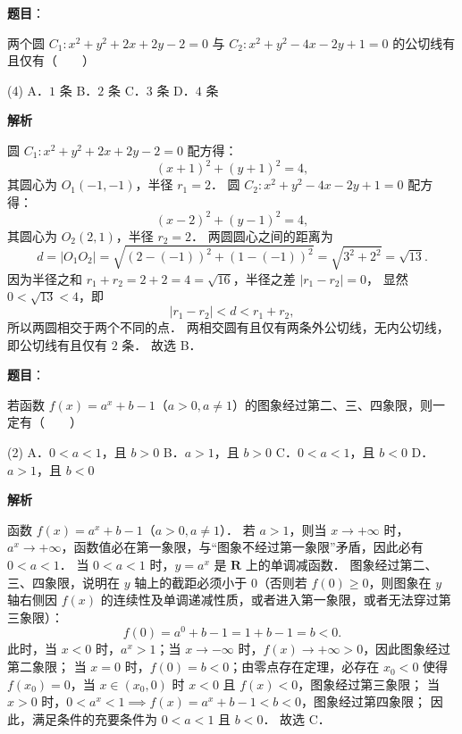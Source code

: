 \begin{answer}

\textbf{题目}：

两个圆 $C_1: x^2 + y^2 + 2x + 2y - 2 = 0$ 与 $C_2: x^2 + y^2 - 4x - 2y + 1 = 0$ 的公切线有且仅有\mbox{（　　）}

\begin{gkopts}(4)
\task A．$1$ 条
\task B．$2$ 条
\task C．$3$ 条
\task D．$4$ 条
\end{gkopts}

\textbf{解析}

圆 $C_1: x^2 + y^2 + 2x + 2y - 2 = 0$ 配方得：
\nopagebreak[4]
\[
(x + 1)^2 + (y + 1)^2 = 4,
\]
其圆心为 $O_1(-1, -1)$，半径 $r_1 = 2$．
圆 $C_2: x^2 + y^2 - 4x - 2y + 1 = 0$ 配方得：
\nopagebreak[4]
\[
(x - 2)^2 + (y - 1)^2 = 4,
\]
其圆心为 $O_2(2, 1)$，半径 $r_2 = 2$．
两圆圆心之间的距离为
\nopagebreak[4]
\[
d = |O_1O_2| = \sqrt{(2 - (-1))^2 + (1 - (-1))^2} = \sqrt{3^2 + 2^2} = \sqrt{13}.
\]
因为半径之和 $r_1 + r_2 = 2 + 2 = 4 = \sqrt{16}$，半径之差 $|r_1 - r_2| = 0$，
显然 $0 < \sqrt{13} < 4$，即
\nopagebreak[4]
\[
|r_1 - r_2| < d < r_1 + r_2,
\]
所以两圆相交于两个不同的点．
两相交圆有且仅有两条外公切线，无内公切线，即公切线有且仅有 $2$ 条．
故选 B．


\end{answer}
\begin{answer}

\textbf{题目}：

若函数 $f(x) = a^x + b - 1$（$a > 0, a \neq 1$）的图象经过第二、三、四象限，则一定有\mbox{（　　）}

\begin{gkopts}(2)
\task A．$0 < a < 1$，且 $b > 0$
\task B．$a > 1$，且 $b > 0$
\task C．$0 < a < 1$，且 $b < 0$
\task D．$a > 1$，且 $b < 0$
\end{gkopts}

\textbf{解析}

函数 $f(x) = a^x + b - 1$（$a > 0, a \neq 1$）．
若 $a > 1$，则当 $x \to +\infty$ 时，$a^x \to +\infty$，函数值必在第一象限，与“图象不经过第一象限”矛盾，因此必有 $0 < a < 1$．
当 $0 < a < 1$ 时，$y = a^x$ 是 $\mathbf{R}$ 上的单调减函数．
图象经过第二、三、四象限，说明在 $y$ 轴上的截距必须小于 $0$（否则若 $f(0) \geqslant 0$，则图象在 $y$ 轴右侧因 $f(x)$ 的连续性及单调递减性质，或者进入第一象限，或者无法穿过第三象限）：
\nopagebreak[4]
\[
f(0) = a^0 + b - 1 = 1 + b - 1 = b < 0.
\]
此时，当 $x < 0$ 时，$a^x > 1$；当 $x \to -\infty$ 时，$f(x) \to +\infty > 0$，因此图象经过第二象限；
当 $x = 0$ 时，$f(0) = b < 0$；由零点存在定理，必存在 $x_0 < 0$ 使得 $f(x_0) = 0$，当 $x \in (x_0, 0)$ 时 $x < 0$ 且 $f(x) < 0$，图象经过第三象限；
当 $x > 0$ 时，$0 < a^x < 1 \implies f(x) = a^x + b - 1 < b < 0$，图象经过第四象限；
因此，满足条件的充要条件为 $0 < a < 1$ 且 $b < 0$．
故选 C．


\end{answer}
